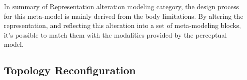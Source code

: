 

In summary of Representation alteration modeling category, the design process for this meta-model is mainly derived from the body limitations. By altering the representation, and reflecting this alteration into a set of meta-modeling blocks, it's possible to match them with the modalities provided by the perceptual model.

\subsection{Topology Reconfiguration}
\label{sec:concept-OpAlt}



